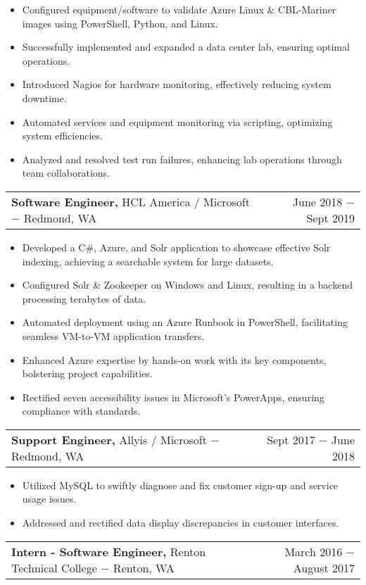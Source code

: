 \documentclass[11pt]{article} %
\makeatletter
\newcommand{\Bullet}[1]{\item{#1 \vspace{-2pt}}}
\newcommand{\BeginBulletList}{\begin{itemize}[leftmargin=12pt]}
\newcommand{\EndBulletList}{\end{itemize}\vspace{0pt}}
\newcommand{\NewJob}[4]{
    \vspace{-10pt}
    \item
    \begin{tabular*}{\textwidth}{l@{\extracolsep{\fill}} r}
        {\textbf{#1,} {#2} $-$ #3} & {#4} \\
    \end{tabular*}

    \vspace{-10pt}
}
\makeatother
\begin{document}
            \BeginBulletList
                \Bullet{Configured equipment/software to validate Azure Linux \& CBL-Mariner images using PowerShell, Python, and Linux.}
                \Bullet{Successfully implemented and expanded a data center lab, ensuring optimal operations.}
                \Bullet{Introduced Nagios for hardware monitoring, effectively reducing system downtime.}
                \Bullet{Automated services and equipment monitoring via scripting, optimizing system efficiencies.}
                \Bullet{Analyzed and resolved test run failures, enhancing lab operations through team collaborations.}
            \EndBulletList

        \vspace{8pt}
        
        \NewJob
            {Software Engineer}
            {HCL America / Microsoft}
            {Redmond, WA}
            {June 2018 $-$ Sept 2019}
            
            \BeginBulletList
                \Bullet{Developed a C\#, Azure, and Solr application to showcase effective Solr indexing, achieving a searchable system for large datasets.}
                \Bullet{Configured Solr \& Zookeeper on Windows and Linux, resulting in a backend processing terabytes of data.}
                \Bullet{Automated deployment using an Azure Runbook in PowerShell, facilitating seamless VM-to-VM application transfers.}
                \Bullet{Enhanced Azure expertise by hands-on work with its key components, bolstering project capabilities.}
                \Bullet{Rectified seven accessibility issues in Microsoft’s PowerApps, ensuring compliance with standards.}
            \EndBulletList

\vspace{8pt}
        
        \NewJob
            {Support Engineer}
            {Allyis / Microsoft}
            {Redmond, WA}
            {Sept 2017 $-$ June 2018}
            
            \BeginBulletList
                \Bullet{Utilized MySQL to swiftly diagnose and fix customer sign-up and service usage issues.}
                \Bullet{Addressed and rectified data display discrepancies in customer interfaces.}

            \EndBulletList
            
\vspace{8pt}
        
        \NewJob
            {Intern - Software Engineer}
            {Renton Technical College}
            {Renton, WA}
            {March 2016 $-$ August 2017}
            
\end{document}
